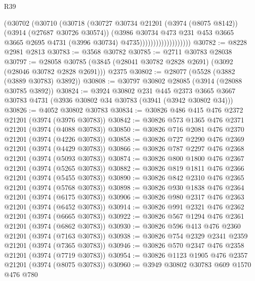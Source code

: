 \begin{lexlean}{R39}
\begin{coremodule}
                                (@30702
                                  (@30710
                                    (@30718
                                      (@30727
                                        @30734
                                        @21201
                                        (@3974 (@8075 @8142))
                                        (@3914 (@27687 @30726 @30574))
                                        (@3986
                                          @30734
                                          @473
                                          @231
                                          @453
                                          @3665
                                          @3665
                                          @2695
                                          @4731
                                          (@3996 @30734)
                                          @4735)))))))))))))))))))
@30782 := @8228 @2981 @2813
@30783 := @3568 @30782
@30785 := @2711 @30783 @28038
@30797 := @28058
    @30785
    (@3845 (@28041 @30782 @2828 @2691) (@3092 (@28046 @30782 @2828 @2691)))
    @2375
@30802 := @28077 (@5528 (@3882 (@3889 @30783) @3892))
@30808 := @30797 @30802 @28085 (@3914 (@28088 @30785 @3892))
@30824 := @3924
    @30802
    @231
    @445
    @2373
    @3665
    @3667
    @30783
    @4731
    (@3936 @30802 @34 @30783 (@3941 (@3942 @30802 @34)))
@30826 := @4052 @30802 @30783
@30834 := @30826 @486 @415 @476 @2372 @21201 (@3974 (@3976 @30783))
@30842 := @30826 @573 @1365 @476 @2371 @21201 (@3974 (@4088 @30783))
@30850 := @30826 @716 @2081 @476 @2370 @21201 (@3974 (@4226 @30783))
@30858 := @30826 @727 @2290 @476 @2369 @21201 (@3974 (@4429 @30783))
@30866 := @30826 @787 @2297 @476 @2368 @21201 (@3974 (@5093 @30783))
@30874 := @30826 @800 @1800 @476 @2367 @21201 (@3974 (@5265 @30783))
@30882 := @30826 @819 @1811 @476 @2366 @21201 (@3974 (@5455 @30783))
@30890 := @30826 @842 @2310 @476 @2365 @21201 (@3974 (@5768 @30783))
@30898 := @30826 @930 @1838 @476 @2364 @21201 (@3974 (@6175 @30783))
@30906 := @30826 @980 @2317 @476 @2363 @21201 (@3974 (@6452 @30783))
@30914 := @30826 @991 @2321 @476 @2362 @21201 (@3974 (@6665 @30783))
@30922 := @30826 @567 @1294 @476 @2361 @21201 (@3974 (@6862 @30783))
@30930 := @30826 @596 @413 @476 @2360 @21201 (@3974 (@7163 @30783))
@30938 := @30826 @754 @2329 @2341 @2359 @21201 (@3974 (@7365 @30783))
@30946 := @30826 @570 @2347 @476 @2358 @21201 (@3974 (@7719 @30783))
@30954 := @30826 @1123 @1905 @476 @2357 @21201 (@3974 (@8075 @30783))
@30960 := @3949 @30802 @30783 @609 @1570 @476 @780

\end{coremodule}
\end{lexlean}

